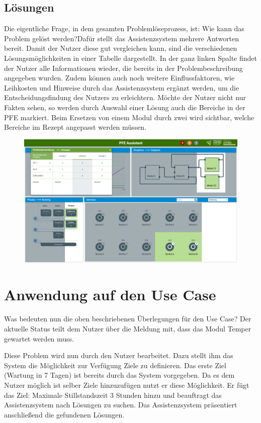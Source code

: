 \subsection{Lösungen}
\label{4:pD-Loesungen}
Die eigentliche Frage, in dem gesamten Problemlöseprozess, ist: \glqq Wie kann das Problem gelöst werden?\grqq Dafür stellt das Assistenzsystem mehrere Antworten bereit. Damit der Nutzer diese gut vergleichen kann, sind die verschiedenen Lösungsmöglichkeiten in einer Tabelle dargestellt. In der ganz linken Spalte findet der Nutzer alle Informationen wieder, die bereits in der Problembeschreibung angegeben wurden. Zudem können auch noch weitere Einflussfaktoren, wie Leihkosten und Hinweise durch das Assistenzsystem ergänzt werden, um die Entscheidungsfindung des Nutzers zu erleichtern. Möchte der Nutzer nicht nur Fakten sehen, so werden durch Auswahl einer Lösung auch die Bereiche in der PFE markiert. Beim Ersetzen von einem Modul durch zwei wird sichtbar, welche Bereiche im Rezept angepasst werden müssen.
\begin{figure}[htbp]
\centering
\includegraphics[angle=90,scale=0.47]{DA_files/Bilder/Konzept/Skizze-Loesungen-PFE.png}
\end{figure}

\section{Anwendung auf den Use Case}
Was bedeuten nun die oben beschriebenen Überlegungen für den Use Case? Der aktuelle Status teilt dem Nutzer über die Meldung mit, dass das Modul Temper gewartet werden muss. 

Diese Problem wird nun durch den Nutzer bearbeitet. Dazu stellt ihm das System die Möglichkeit zur Verfügung Ziele zu definieren. Das erste Ziel (Wartung in 7 Tagen) ist bereits durch das System vorgegeben. Da es dem Nutzer möglich ist selber Ziele hinzuzufügen nutzt er diese Möglichkeit. Er fügt das Ziel: Maximale Stillstandszeit 3 Stunden hinzu und beauftragt das Assistenzsystem nach Lösungen zu suchen. Das Assistenzsystem präsentiert anschließend die gefundenen Lösungen. 